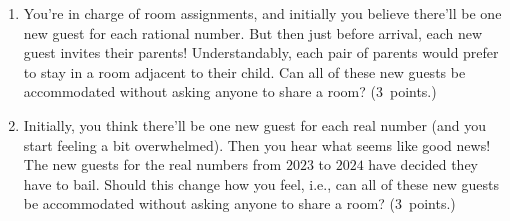 \documentclass[12pt,letterpaper]{article}
\begin{document}
\begin{enumerate}
\begin{enumerate}
\item You're in charge of room assignments, and initially you believe there'll be one new guest for each rational number. But then just before arrival, each new guest invites their parents! Understandably, each pair of parents would prefer to stay in a room adjacent to their child. Can all of these new guests be accommodated without asking anyone to share a room? (3~points.)


\item Initially, you think there'll be one new guest for each real number (and you start feeling a bit overwhelmed). Then you hear what seems like good news! The new guests for the real numbers from $2023$ to $2024$ have decided they have to bail. Should this change how you feel, i.e., can all of these new guests be accommodated without asking anyone to share a room? (3~points.)
 



\end{enumerate}








\end{enumerate}





\end{document}
